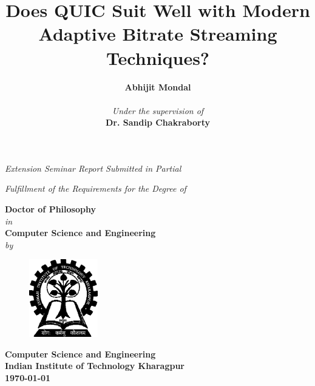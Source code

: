 \title{\bf{Does QUIC Suit Well with Modern Adaptive Bitrate Streaming Techniques?}}
\date{}
\author{}
\maketitle
\thispagestyle{empty}
\begin{center}
	\vspace*{5mm}
	\textit{Extension Seminar Report Submitted in Partial}
	\par
	\vspace*{4mm}
	\textit{Fulfillment of the Requirements for the Degree of}
	\par
	\vspace*{5mm}
	{\large\textbf{Doctor of Philosophy}\\
		\vspace*{2mm}\textit{in}\\
		\vspace*{2mm}\large\textbf{Computer Science and Engineering}
		\\\vspace*{2mm}\textit{by}\\
		\vspace*{2mm}}
	\author{\large\textbf{Abhijit Mondal}\\
		\vspace*{2mm}{\small{[Roll No - 15CS91R09]}}\\
		\vspace*{15mm}\textit{Under the supervision of}\\
		\vspace*{2mm}\textbf{Dr. Sandip Chakraborty}\\}
	\vspace*{30mm}
	\begin{figure}[!ht]
		\centering
		\includegraphics[width=3cm]{img/iit_logo}
	\end{figure}
	\bf{Computer Science and Engineering
		\\Indian Institute of Technology Kharagpur
	}\\
	\today
\end{center}
\newpage